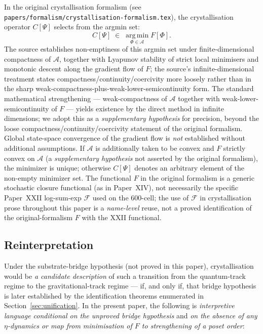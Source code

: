 \documentclass[12pt]{article}
\newcommand{\Fcal}{\mathcal{F}}
\begin{document}
In the original crystallisation formalism (see \texttt{papers/formalism/crystallisation-formalism.tex}), the crystallisation operator $C[\Psi]$ selects from the argmin set:
\begin{equation}
C[\Psi] \;\in\; \operatorname*{arg\,min}_{\Phi \in \mathcal A} F[\Phi].
\end{equation}
The source establishes non-emptiness of this argmin set under finite-dimensional compactness of $\mathcal A$, together with Lyapunov stability of strict local minimisers and monotonic descent along the gradient flow of $F$; the source's infinite-dimensional treatment states compactness/continuity/coercivity more loosely rather than in the sharp weak-compactness-plus-weak-lower-semicontinuity form. The standard mathematical strengthening --- weak-compactness of $\mathcal A$ together with weak-lower-semicontinuity of $F$ --- yields existence by the direct method in infinite dimensions; we adopt this as a \emph{supplementary hypothesis} for precision, beyond the loose compactness/continuity/coercivity statement of the original formalism. Global state-space convergence of the gradient flow is \emph{not} established without additional assumptions. If $\mathcal A$ is additionally taken to be convex and $F$ strictly convex on $\mathcal A$ (a \emph{supplementary hypothesis} not asserted by the original formalism), the minimizer is unique; otherwise $C[\Psi]$ denotes an arbitrary element of the non-empty minimizer set. The functional $F$ in the original formalism is a generic stochastic closure functional (as in Paper~XIV), not necessarily the specific Paper~XXII log-sum-exp $\Fcal$ used on the 600-cell; the use of $\Fcal$ in crystallisation prose throughout this paper is a \emph{name-level} reuse, not a proved identification of the original-formalism $F$ with the XXII functional.

\subsection{Reinterpretation}

Under the substrate-bridge hypothesis (not proved in this paper), crystallisation would be \emph{a candidate description} of such a transition from the quantum-track regime to the gravitational-track regime --- if, and only if, that bridge hypothesis is later established by the identification theorems enumerated in Section~\ref{sec:unification}. In the present paper, the following is \emph{interpretive language conditional on the unproved bridge hypothesis} and \emph{on the absence of any $\eta$-dynamics or map from minimisation of $F$ to strengthening of a poset order}:
\end{document}
